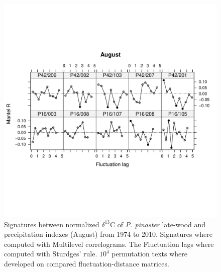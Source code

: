 \documentclass[review,authoryear]{elsarticle}
\begin{document}
\begin{figure}\centering
\includegraphics[scale=0.8,trim=20mm 0mm 20mm 0mm]{mflucAug} 
\caption{Signatures between normalized $\delta^{13}$C of
  \textit{P. pinaster} late-wood and precipitation indexes
  (August) from 1974 to 2010. Signatures where computed with Multilevel
  correlograms. The Fluctuation lags where computed with Sturdges'
  rule. $10^4$ permutation texts where developed on compared
  fluctuation-distance matrices.}
\label{fig:sigaug} 
\end{figure}
\end{document}
